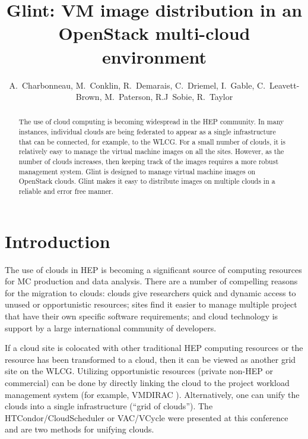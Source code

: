\documentclass[a4paper]{jpconf}
\begin{document}
\linenumbers

\title{Glint: VM image distribution in an OpenStack multi-cloud environment}

\author{A.~Charbonneau, M.~Conklin, R.~Demarais, C.~Driemel, I.~Gable, C.~Leavett-Brown, 
M.~Paterson, R.J~Sobie, R.~Taylor}

\address{University of Victoria, Victoria, Canada}


\begin{abstract}
The use of cloud computing is becoming widespread in the HEP community.  
In many instances, individual clouds are being federated to appear as a single
infrastructure that can be connected, for example, to the WLCG.
For a small number of clouds, it is relatively easy to manage the virtual
machine images on all the sites.  
However, as the number of clouds increases, then keeping track of the images
requires a more robust management system.
Glint is designed to manage virtual machine images on OpenStack clouds.
Glint makes it easy to distribute images on multiple clouds in a reliable and
error free manner. 
\end{abstract}

\section{Introduction}

The use of clouds in HEP is becoming a significant source of computing resources 
for MC production and data analysis.
There are a number of compelling reasons for the migration to clouds:
clouds give researchers quick and dynamic access to unused or opportunistic
resources;  sites find it easier to manage multiple project that have their
own specific software requirements; and cloud technology is support by a
large international community of developers.

If a cloud site is colocated with other traditional HEP computing resources or
the resource has been transformed to a cloud, then it can be viewed as another
grid site on the WLCG.
Utilizing opportunistic resources (private non-HEP or commercial) can be done
by directly linking the cloud to the project workload management system (for example,
VMDIRAC \cite{vmdirac}).
Alternatively, one can unify the clouds into a single infrastructure (``grid of clouds'').
The HTCondor/CloudScheduler \cite{chep:gable-talk} or VAC/VCycle \cite{chep:vac-vcycle}
were presented at this conference and are two methods for unifying clouds.
 
\end{document}

